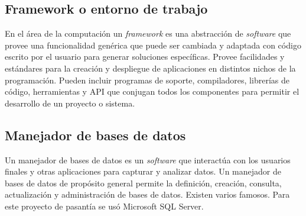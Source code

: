 \subsection{Framework o entorno de trabajo} 

En el área de la computación un \emph{framework} es una abstracción de \emph{software} que provee una funcionalidad genérica que puede ser cambiada y adaptada con código escrito por el usuario para generar soluciones específicas. Provee facilidades y estándares para la creación y despliegue de aplicaciones en distintos nichos de la programación. Pueden incluir programas de soporte, compiladores, librerías de código, herramientas y \gls{API} que conjugan todos los componentes para permitir el desarrollo de un proyecto o sistema\cite{bib:framework}.

\subsection{Manejador de bases de datos} 

Un manejador de bases de datos es un \emph{software} que interactúa con los usuarios finales y otras aplicaciones para capturar y analizar datos. Un manejador de bases de datos de propósito general permite la definición, creación, consulta, actualización y administración de bases de datos. Existen varios famosos. Para este proyecto de pasantía se usó Microsoft \gls{SQL} Server\cite{bib:dbms}.

